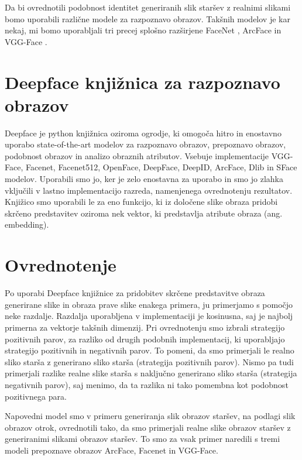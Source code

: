 \documentclass[a4paper,12pt,openright]{book}
\begin{document}
Da bi ovrednotili podobnost identitet generiranih slik staršev z realnimi slikami bomo uporabili različne modele za razpoznavo obrazov.
Takšnih modelov je kar nekaj, mi bomo uporabljali tri precej splošno razširjene FaceNet \cite{facenet}, ArcFace \cite{arcface} in VGG-Face \cite{vggface}.


\section{Deepface knjižnica za razpoznavo obrazov}
Deepface je python knjižnica oziroma ogrodje, ki omogoča hitro in enostavno uporabo state-of-the-art modelov za razpoznavo obrazov, prepoznavo obrazov, podobnost obrazov in analizo obraznih atributov. 
Vsebuje implementacije VGG-Face, Facenet, Facenet512, OpenFace, DeepFace, DeepID, ArcFace, Dlib in SFace modelov.
Uporabili smo jo, ker je zelo enostavna za uporabo in smo jo zlahka vključili v lastno implementacijo razreda, namenjenega ovrednotenju rezultatov.
Knjižico smo uporabili le za eno funkcijo, ki iz določene slike obraza pridobi skrčeno predstavitev oziroma nek vektor, ki predstavlja atribute obraza (ang. embedding).

\section{Ovrednotenje}
Po uporabi Deepface knjižnice za pridobitev skrčene predstavitve obraza generirane slike in obraza prave slike enakega primera, ju primerjamo s pomočjo neke razdalje. 
Razdalja uporabljena v implementaciji je kosinusna, saj je najbolj primerna za vektorje takšnih dimenzij. 
Pri ovrednotenju smo izbrali strategijo pozitivnih parov, za razliko od drugih podobnih implementacij, ki uporabljajo strategijo pozitivnih in negativnih parov. To pomeni, da smo primerjali le realno sliko starša z generirano sliko starša (strategija pozitivnih parov). 
Nismo pa tudi primerjali razlike realne slike starša s naključno generirano sliko starša (strategija negativnih parov), saj menimo, da ta razlika ni tako pomembna kot podobnost pozitivnega para.




Napovedni model smo v primeru generiranja slik obrazov staršev, na podlagi slik obrazov otrok, ovrednotili tako, da smo primerjali realne slike obrazov staršev z generiranimi slikami obrazov staršev. 
To smo za vsak primer naredili s tremi modeli prepoznave obrazov ArcFace, Facenet in VGG-Face. 
\end{document}
